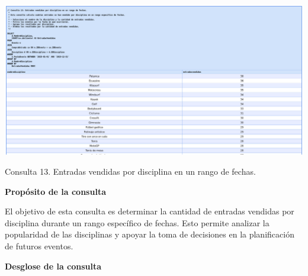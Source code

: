 \begin{center}
    \includegraphics[width=16.5cm]{resources/Consulta13.jpeg} 
    
   Consulta 13. Entradas vendidas por disciplina en un rango de fechas.
\end{center}

\textbf{Propósito de la consulta}

El objetivo de esta consulta es determinar la cantidad de entradas vendidas por disciplina durante un rango específico de fechas. Esto permite analizar la popularidad de las disciplinas y apoyar la toma de decisiones en la planificación de futuros eventos.

\textbf{Desglose de la consulta}

